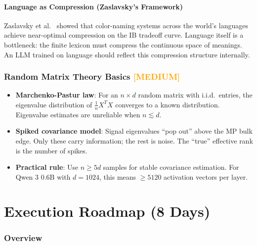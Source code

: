 \documentclass[11pt,a4paper]{article}
\begin{document}
\subsection{Language as Compression (Zaslavsky's Framework)}
Zaslavsky et al.\ \cite{zaslavsky2018efficient} showed that color-naming systems across the world's languages achieve near-optimal compression on the IB tradeoff curve. Language itself is a bottleneck: the finite lexicon must compress the continuous space of meanings. An LLM trained on language should reflect this compression structure internally.

\section{Random Matrix Theory Basics \textnormal{\textcolor{orange}{[MEDIUM]}}}

\begin{itemize}
    \item \textbf{Marchenko-Pastur law}: For an $n \times d$ random matrix with i.i.d.\ entries, the eigenvalue distribution of $\frac{1}{n}X^TX$ converges to a known distribution. Eigenvalue estimates are unreliable when $n \lesssim d$.
    \item \textbf{Spiked covariance model}: Signal eigenvalues ``pop out'' above the MP bulk edge. Only these carry information; the rest is noise. The ``true'' effective rank is the number of spikes.
    \item \textbf{Practical rule}: Use $n \geq 5d$ samples for stable covariance estimation. For Qwen 3 0.6B with $d = 1024$, this means $\geq 5120$ activation vectors per layer.
\end{itemize}


\newpage
\part{Execution Roadmap (8 Days)}

\section{Overview}
\end{document}

